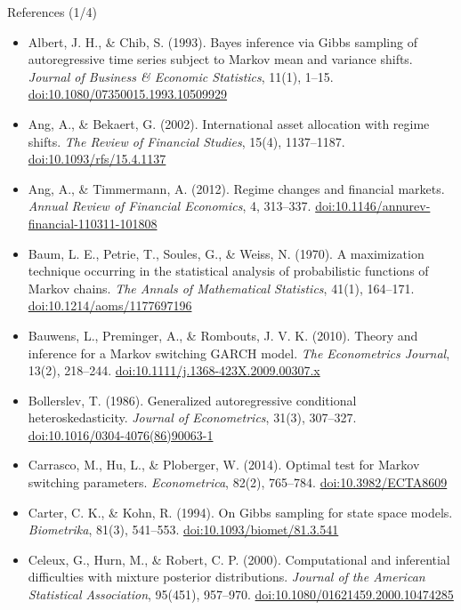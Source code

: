 \begin{frame}{References (1/4)}
\itemsize{\tiny}
\begin{itemize}
    \item Albert, J. H., \& Chib, S. (1993). Bayes inference via Gibbs sampling of autoregressive time series subject to Markov mean and variance shifts. \textit{Journal of Business \& Economic Statistics}, 11(1), 1--15. \href{https://doi.org/10.1080/07350015.1993.10509929}{doi:10.1080/07350015.1993.10509929}
    \item Ang, A., \& Bekaert, G. (2002). International asset allocation with regime shifts. \textit{The Review of Financial Studies}, 15(4), 1137--1187. \href{https://doi.org/10.1093/rfs/15.4.1137}{doi:10.1093/rfs/15.4.1137}
    \item Ang, A., \& Timmermann, A. (2012). Regime changes and financial markets. \textit{Annual Review of Financial Economics}, 4, 313--337. \href{https://doi.org/10.1146/annurev-financial-110311-101808}{doi:10.1146/annurev-financial-110311-101808}
    \item Baum, L. E., Petrie, T., Soules, G., \& Weiss, N. (1970). A maximization technique occurring in the statistical analysis of probabilistic functions of Markov chains. \textit{The Annals of Mathematical Statistics}, 41(1), 164--171. \href{https://doi.org/10.1214/aoms/1177697196}{doi:10.1214/aoms/1177697196}
    \item Bauwens, L., Preminger, A., \& Rombouts, J. V. K. (2010). Theory and inference for a Markov switching GARCH model. \textit{The Econometrics Journal}, 13(2), 218--244. \href{https://doi.org/10.1111/j.1368-423X.2009.00307.x}{doi:10.1111/j.1368-423X.2009.00307.x}
    \item Bollerslev, T. (1986). Generalized autoregressive conditional heteroskedasticity. \textit{Journal of Econometrics}, 31(3), 307--327. \href{https://doi.org/10.1016/0304-4076(86)90063-1}{doi:10.1016/0304-4076(86)90063-1}
    \item Carrasco, M., Hu, L., \& Ploberger, W. (2014). Optimal test for Markov switching parameters. \textit{Econometrica}, 82(2), 765--784. \href{https://doi.org/10.3982/ECTA8609}{doi:10.3982/ECTA8609}
    \item Carter, C. K., \& Kohn, R. (1994). On Gibbs sampling for state space models. \textit{Biometrika}, 81(3), 541--553. \href{https://doi.org/10.1093/biomet/81.3.541}{doi:10.1093/biomet/81.3.541}
    \item Celeux, G., Hurn, M., \& Robert, C. P. (2000). Computational and inferential difficulties with mixture posterior distributions. \textit{Journal of the American Statistical Association}, 95(451), 957--970. \href{https://doi.org/10.1080/01621459.2000.10474285}{doi:10.1080/01621459.2000.10474285}

\end{itemize}
\end{frame}

